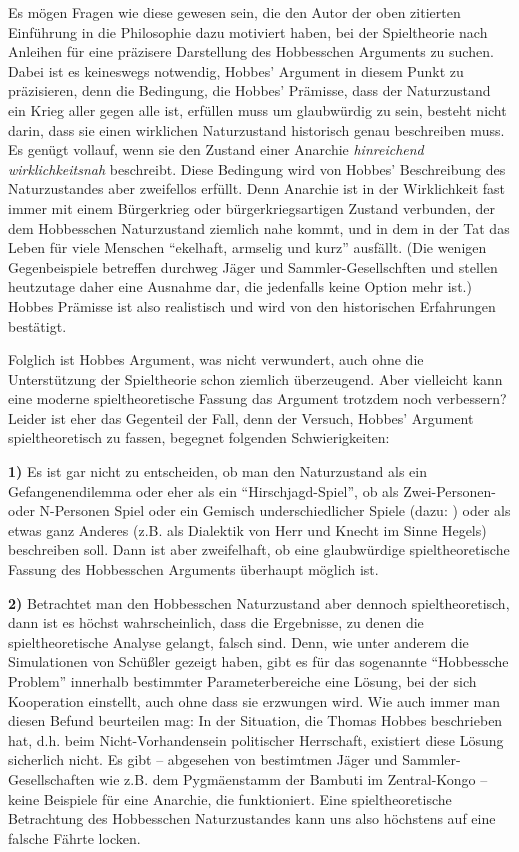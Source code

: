 \documentclass[12pt,a4paper,ngerman]{article}
\begin{document}
Es mögen Fragen wie diese gewesen sein, die den Autor der oben
zitierten Einführung in die Philosophie dazu motiviert haben, bei der
Spieltheorie nach Anleihen für eine präzisere Darstellung des
Hobbesschen Arguments zu suchen.  Dabei ist es keineswegs notwendig,
Hobbes' Argument in diesem Punkt zu präzisieren, denn die Bedingung,
die Hobbes' Prämisse, dass der Naturzustand ein Krieg aller gegen alle
ist, erfüllen muss um glaubwürdig zu sein, besteht nicht darin, dass
sie einen wirklichen Naturzustand historisch genau beschreiben
muss. Es genügt vollauf, wenn sie den Zustand einer Anarchie {\em
hinreichend wirklichkeitsnah} beschreibt. Diese Bedingung wird von
Hobbes' Beschreibung des Naturzustandes aber zweifellos erfüllt. Denn
Anarchie ist in der Wirklichkeit fast immer mit einem Bürgerkrieg oder
bürgerkriegsartigen Zustand verbunden, der dem Hobbesschen
Naturzustand ziemlich nahe kommt, und in dem in der Tat das Leben für
viele Menschen "`ekelhaft, armselig und kurz"' ausfällt. (Die wenigen
Gegenbeispiele betreffen durchweg Jäger und Sammler-Gesellschften und
stellen heutzutage daher eine Ausnahme dar, die jedenfalls keine
Option mehr ist.) Hobbes Prämisse ist also realistisch und wird von
den historischen Erfahrungen bestätigt.

Folglich ist Hobbes Argument, was nicht verwundert, auch ohne die
Unterstützung der Spieltheorie schon ziemlich überzeugend. Aber vielleicht kann
eine moderne spieltheoretische Fassung das Argument trotzdem noch verbessern?
Leider ist eher das Gegenteil der Fall, denn der Versuch, Hobbes' Argument
spieltheoretisch zu fassen, begegnet folgenden Schwierigkeiten:

{\bf 1)} Es ist gar nicht zu entscheiden, ob man den Naturzustand als ein
Gefangenendilemma oder eher als ein "`Hirschjagd-Spiel"', ob als Zwei-Personen-
oder N-Personen Spiel oder ein Gemisch underschiedlicher
Spiele (dazu: \cite[S. 117-125]{binmore:1994}) oder als etwas ganz Anderes
(z.B. als Dialektik von Herr und Knecht im Sinne Hegels) beschreiben soll. Dann
ist aber zweifelhaft, ob eine glaubwürdige spieltheoretische Fassung des
Hobbesschen Arguments überhaupt möglich ist.

{\bf 2)} Betrachtet man den Hobbesschen Naturzustand aber dennoch
spieltheoretisch, dann ist es höchst wahrscheinlich, dass die Ergebnisse, zu
denen die spieltheoretische Analyse gelangt, falsch sind. Denn, wie
unter anderem die Simulationen von Schüßler gezeigt haben, gibt es für das
sogenannte "`Hobbessche Problem"' innerhalb bestimmter Parameterbereiche eine
Lösung, bei der sich Kooperation einstellt, auch ohne dass sie erzwungen wird.
Wie auch immer man diesen Befund beurteilen mag: In der Situation, die Thomas
Hobbes beschrieben hat, d.h. beim Nicht-Vorhandensein politischer Herrschaft,
existiert diese Lösung sicherlich nicht. Es gibt -- abgesehen von bestimtmen
Jäger und Sammler-Gesellschaften wie z.B. dem Pygmäenstamm der Bambuti im
Zentral-Kongo \cite[S. 221-223]{appiah:2003} -- keine Beispiele für eine
Anarchie, die funktioniert. Eine spieltheoretische Betrachtung des Hobbesschen
Naturzustandes kann uns also höchstens auf eine falsche Fährte locken.
\end{document}
